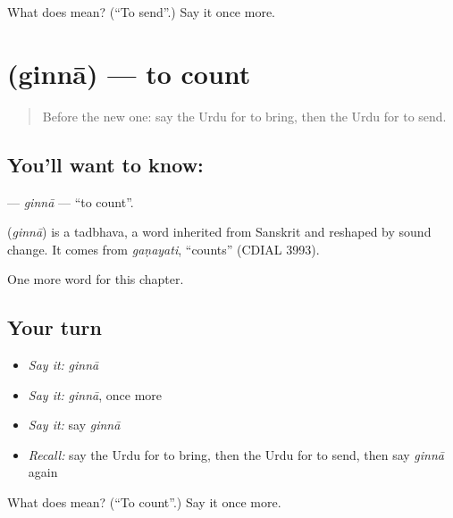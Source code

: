 \begin{tcolorbox}[breakable,colback=teal!4,colframe=teal!35!black,title={Before you move on}]
What does  mean? (\textquotedblleft{}To send\textquotedblright{}.) Say it once more.
\end{tcolorbox}
\section[\texorpdfstring{\ur{گننا} (ginnā)}{گننا (ginnā)}]{ (ginnā) — to count}

\label{lesson:UR-C51-ginna}



\begin{quote}
Before the new one: say the Urdu for to bring, then the Urdu for to send.
\end{quote}

\subsection*{You'll want to know: }
\textbf{} — \emph{ginnā} — \textquotedblleft{}to count\textquotedblright{}.

\begin{cousinweb}
\textbf{} (\emph{ginnā}) is a tadbhava, a word inherited from Sanskrit and reshaped by sound change. It comes from \emph{gaṇayati}, \textquotedblleft{}counts\textquotedblright{} (CDIAL 3993).
\end{cousinweb}

\begin{grammarlens}[title={What you've built}]
One more word for this chapter.
\end{grammarlens}

\subsection*{Your turn}
\begin{itemize}
\raggedright
  \item \emph{Say it:} \emph{ginnā}
  \item \emph{Say it:} \emph{ginnā}, once more
  \item \emph{Say it:} say \emph{ginnā}
  \item \emph{Recall:} say the Urdu for to bring, then the Urdu for to send, then say \emph{ginnā} again
\end{itemize}

\begin{tcolorbox}[breakable,colback=teal!4,colframe=teal!35!black,title={Before you move on}]
What does  mean? (\textquotedblleft{}To count\textquotedblright{}.) Say it once more.
\end{tcolorbox}
